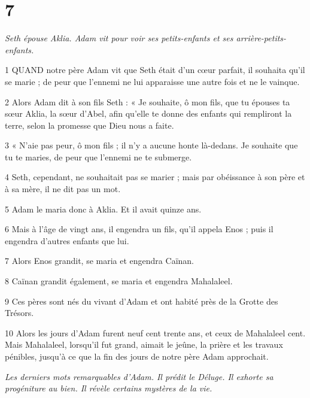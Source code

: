 \chapter{7}

\par \textit{Seth épouse Aklia. Adam vit pour voir ses petits-enfants et ses arrière-petits-enfants.}

\par 1 QUAND notre père Adam vit que Seth était d'un cœur parfait, il souhaita qu'il se marie ; de peur que l'ennemi ne lui apparaisse une autre fois et ne le vainque.

\par 2 Alors Adam dit à son fils Seth : « Je souhaite, ô mon fils, que tu épouses ta sœur Aklia, la sœur d'Abel, afin qu'elle te donne des enfants qui rempliront la terre, selon la promesse que Dieu nous a faite.

\par 3 « N'aie pas peur, ô mon fils ; il n’y a aucune honte là-dedans. Je souhaite que tu te maries, de peur que l'ennemi ne te submerge.

\par 4 Seth, cependant, ne souhaitait pas se marier ; mais par obéissance à son père et à sa mère, il ne dit pas un mot.

\par 5 Adam le maria donc à Aklia. Et il avait quinze ans.

\par 6 Mais à l'âge de vingt ans, il engendra un fils, qu'il appela Enos ; puis il engendra d'autres enfants que lui.

\par 7 Alors Enos grandit, se maria et engendra Caïnan.

\par 8 Caïnan grandit également, se maria et engendra Mahalaleel.

\par 9 Ces pères sont nés du vivant d'Adam et ont habité près de la Grotte des Trésors.

\par 10 Alors les jours d'Adam furent neuf cent trente ans, et ceux de Mahalaleel cent. Mais Mahalaleel, lorsqu'il fut grand, aimait le jeûne, la prière et les travaux pénibles, jusqu'à ce que la fin des jours de notre père Adam approchait.


\par \textit{Les derniers mots remarquables d'Adam. Il prédit le Déluge. Il exhorte sa progéniture au bien. Il révèle certains mystères de la vie.}

